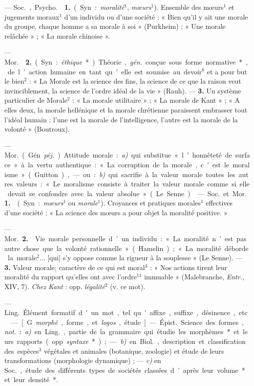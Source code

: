 \begin{itemize}[leftmargin=1cm, label=, itemsep=1pt]
 — \si{Soc.}, \si{Psycho.}  {\bf 1.} (Syn. :
{\it moralité}$^1$, {\it mœurs}$^1$). Ensemble des mœurs$^1$ et jugements
moraux$^1$ d’un
individu ou d’une société : « Bien qu’il y ait une morale du groupe, chaque
homme a sa morale à soi » (Purkheim) ; « Une morale relâchée » ; « La morale
chinoise ».

— \si{Mor.}  {\bf 2.} (Syn. : {\it éthique}*). Théorie,
{\it gén.} conçue sous forme normative*, de l’action humaine en tant qu’elle
est soumise au devoir$^6$ et a pour but le bien$^2$ : « La Morale est la
science des fins, la science de ce que la raison veut invinciblement, la
science de l’ordre idéal de la vie » (Rauh). — {\bf 3.} Un système
particulier de Morale$^2$ : « La morale utilitaire » ; « La morale de
Kant » ; « A elles deux, la morale hellénique et la morale chrétienne
paraissent embrasser tout l'idéal humain : l’une est la morale de
l'intelligence, l’autre est la morale de la volonté » (Boutroux).

 — \si{Mor.} (Gén. {\it péj.}) Attitude morale : {\it a)} qui
substitue « l’honnêteté de surface » à la vertu authentique : « La corruption
de la morale, c'est le moralisme » (Guitton), — ou : {\it b)} qui sacrifie à
la valeur morale toutes les autres valeurs : « Le moralisme consiste à
traiter la valeur morale comme si elle devait se confondre avec la valeur
absolue » (Le Senne).

 — \si{Soc.} et \si{Mor.} {\bf 1.}  (Syn. :
{\it mœurs}$^1$ ou {\it morale}$^1$). Croyances et pratiques morales$^1$
effectives d’une société : « La science des mœurs a pour objet la moralité
positive. »

— \si{Mor.} {\bf 2.}  Vie morale personnelle d’un individu :
« La moralité n’est pas autre chose que la volonté rationnelle » (Hamelin) ;
« La moralité déborde la morale$^2$... [qui] s’y oppose comme la rigueur à la
souplesse » (Le Senne). — {\bf 3.}  Valeur morale; caractère
de ce qui est moral$^3$ : « Nos actions tirent leur
moralité du rapport qu’elles ont avec l’ordre$^{11}$ immuable » (Malebranche,
{\it Entr.}, XIV, 7). {\it Chez Kant} : opp. {\it légalité}$^2$ (v. ce mot).

 — \si{Ling.} Élément formatif d'un mot, tel qu'affixe, suffixe,
désinence, etc.

 — [G. {\it morphê}, forme, et {\it logos}, étude] —
\si{Épist.} Science des formes, {\it not.} : {\it a)} en \si{Ling.}, partie
de la grammaire qui étudie les morphèmes* et leurs rapports (opp.
{\it syntaxe}*) ; — {\it b)} en \si{Biol.}, description et classification des
espèces$^3$ végétales et animales (botanique, zoologie) et étude de leurs
transformations (morphologie dynamique) ; — {\it c)} en \si{Soc.}, étude des
différents types de sociétés classées d’après leur volume* et leur densité*.


\end{itemize}
